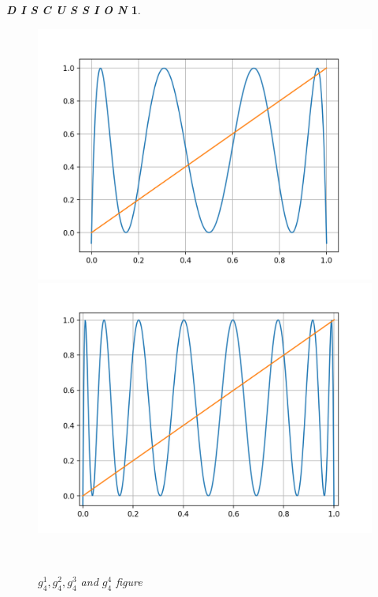 \documentclass[12pt]{article}
\theoremstyle{plain}
\newtheorem{discussion}{\textit{D I S C U S S I O N}}[section]
\begin{document}
\begin{discussion}
\begin{figure}[H]
\begin{minipage}[c][0.24\width]{0.24\textwidth}
\end{minipage}
\begin{minipage}[c][0.24\width]{0.24\textwidth}
   \centering
   \includegraphics[width=\textwidth]{figure/section1/4-logistic-ite-3.png}
\end{minipage}
\begin{minipage}[c][0.24\width]{0.24\textwidth}
   \centering
   \includegraphics[width=\textwidth]{figure/section1/4-logistic-ite-4.png}
\end{minipage}
\\[3ex]\caption{$g_4^1, g_4^2, g_4^3$ and $g_4^4$ figure}\label{4-logistic-ite}
\end{figure}


\end{discussion}
\end{document}
